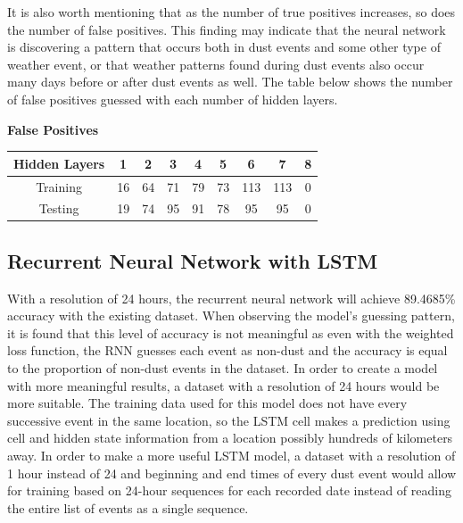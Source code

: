 \documentclass{article}
\begin{document}
It is also worth mentioning that as the number of true positives increases, so does the number of false positives. This finding may indicate that the neural network is discovering a pattern that occurs both in dust events and some other type of weather event, or that weather patterns found during dust events also occur many days before or after dust events as well. The table below shows the number of false positives guessed with each number of hidden layers.
\begin{center}
	\textbf{False Positives}\\
	\begin{tabular}{ |c|c|c|c|c|c|c|c|c| }
		\hline
		Hidden Layers & 1 & 2 & 3 & 4 & 5 & 6 & 7 & 8 \\
		\hline
		Training & 16 & 64 & 71 & 79 & 73 & 113 & 113 & 0 \\
		\hline
		Testing & 19 & 74 & 95 & 91 & 78 & 95 & 95 & 0 \\
		\hline
	\end{tabular}
\end{center}
\subsection{Recurrent Neural Network with LSTM}
With a resolution of 24 hours, the recurrent neural network will achieve 89.4685\% accuracy with the existing dataset. When observing the model's guessing pattern, it is found that this level of accuracy is not meaningful as even with the weighted loss function, the RNN guesses each event as non-dust and the accuracy is equal to the proportion of non-dust events in the dataset. In order to create a model with more meaningful results, a dataset with a resolution of 24 hours would be more suitable. The training data used for this model does not have every successive event in the same location, so the LSTM cell makes a prediction using cell and hidden state information from a location possibly hundreds of kilometers away. In order to make a more useful LSTM model, a dataset with a resolution of 1 hour instead of 24 and beginning and end times of every dust event would allow for training based on 24-hour sequences for each recorded date instead of reading the entire list of events as a single sequence.
\end{document}
